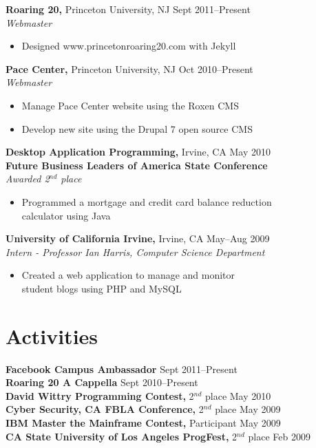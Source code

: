 \documentclass[margin]{res}
\begin{document}
\begin{resume}
 {\bf Roaring 20,} Princeton University, NJ \hfill Sept 2011--Present \\
 {\it Webmaster}
 \begin{itemize} \itemsep -2pt  %
 \item Designed www.princetonroaring20.com with Jekyll
 \end{itemize}

 {\bf Pace Center,} Princeton University, NJ \hfill Oct 2010--Present \\
 {\it Webmaster}
 \begin{itemize} \itemsep -2pt  %
 \item Manage Pace Center website using the Roxen CMS
 \item Develop new site using the Drupal 7 open source CMS
 \end{itemize}
 
 {\bf Desktop Application Programming,} Irvine, CA \hfill May 2010 \\
 {\bf Future Business Leaders of America State Conference} \\
 {\it Awarded 2$^{nd}$ place}
 \begin{itemize} \itemsep -2pt  %
 \item Programmed a mortgage and credit card balance reduction \\ 
   calculator using Java
 \end{itemize}

 {\bf University of California Irvine,} Irvine, CA \hfill May--Aug
 2009 \\
 {\it Intern - Professor Ian Harris, Computer Science Department}
 \begin{itemize} \itemsep -2pt  %
 \item Created a web application to manage and monitor \\
   student blogs using PHP and MySQL 
 \end{itemize}


 
\section{Activities}
 {\bf Facebook Campus Ambassador} \hfill Sept 2011--Present \\
 {\bf Roaring 20 A Cappella} \hfill Sept 2010--Present \\
 {\bf David Wittry Programming Contest,} 2$^{nd}$ place \hfill May 2010 \\
 {\bf Cyber Security, CA FBLA Conference,} 2$^{nd}$ place \hfill May 2009 \\
 {\bf IBM Master the Mainframe Contest,} Participant \hfill May 2009 \\
 {\bf CA State University of Los Angeles ProgFest,}
 2$^{nd}$ place \hfill Feb 2009

\end{resume}
\end{document}
